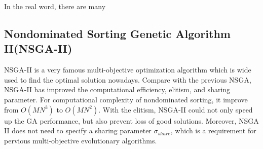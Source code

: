 In the real word, there are many

\subsection{Nondominated Sorting Genetic Algorithm II(NSGA-II)}
NSGA-II\cite{NSGA-II} is a very famous multi-objective optimization algorithm which is wide used  to find the optimal solution nowadays. Compare with the previous NSGA, NSGA-II has improved the computational efficiency, elitism, and sharing parameter. For computational complexity of nondominated sorting, it improve from \(O(MN^{3})\) to \(O(MN^{2})\). With the elitism, NSGA-II could not only speed up the GA performance, but also prevent loss of good solutions. Moreover, NSGA II does not need to specify a sharing parameter \(\sigma_{share}\), which is a requirement for pervious multi-objective evolutionary algorithms.
